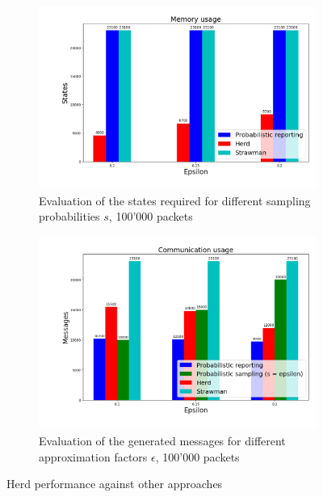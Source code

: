 \documentclass[11pt,oneside,a4paper]{article}
\begin{document}
\begin{figure}%
	\centering
	\begin{subfigure}{.5\textwidth}
		\centering
		\includegraphics[width=\linewidth]{figures/required_states}
		\caption{Evaluation of the states required for \newline
			different sampling probabilities $s$, 100'000 packets}
		\label{fig:states_required}
	\end{subfigure}%
	\begin{subfigure}{.5\textwidth}
		\centering
		\includegraphics[width=\linewidth]{figures/generated_messages}
		\caption{Evaluation of the generated messages for \newline 
			different approximation factors $\epsilon$, 100'000 packets}
		\label{fig:messages_generated}
	\end{subfigure}
\caption{Herd performance against other approaches}
\end{figure}
\end{document}
